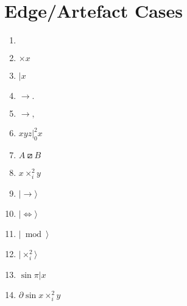 \documentclass{article}
\begin{document}
\section{Edge/Artefact Cases}
\begin{enumerate}
  \item $\,$  %
  \item $\times x$ %
  \item $\mathbin{|} x$ %
  \item $\rightarrow.$
  \item $\rightarrow,$
  \item $\left. xyz \right|_0^2 x$
  \item $ A \boxslash B $
  \item $ x \times_i^2 y $ %
  \item $| \rightarrow \rangle$ %
  \item $| \iff \rangle$ %
  \item $| \bmod \rangle$ %
  \item $| \times_i^2 \rangle$ %
  \item $\sin \pi | x$ %
  \item $\partial \sin x\times_i^2 y $ %

\end{enumerate}
\end{document}
